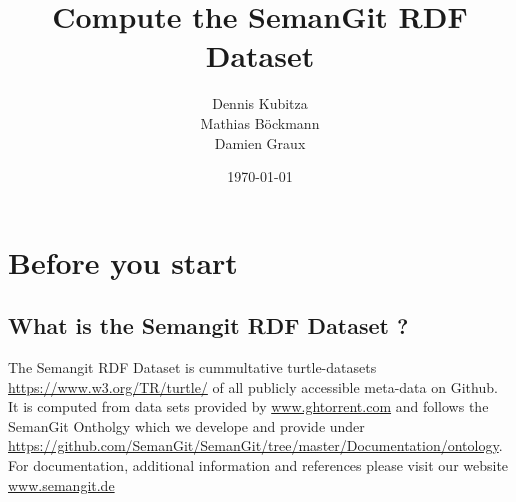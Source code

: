 \documentclass[11pt]{article}
\title{\textbf{Compute the SemanGit RDF Dataset}}
\author{Dennis Kubitza \\ Mathias B\"ockmann \\ Damien Graux}
\date{\today}
\begin{document}
\maketitle
\tableofcontents
\newpage
\section{Before you start}
\subsection{What is the Semangit RDF Dataset ?}
The Semangit RDF Dataset is cummultative turtle-datasets \url{https://www.w3.org/TR/turtle/} of all publicly accessible meta-data on Github. It is computed from data sets provided by \url{www.ghtorrent.com} \cite{ghtorrent} and follows the SemanGit Ontholgy which we develope and provide under \url{https://github.com/SemanGit/SemanGit/tree/master/Documentation/ontology}. For documentation, additional information and references please visit our website \url{www.semangit.de}
\end{document}
